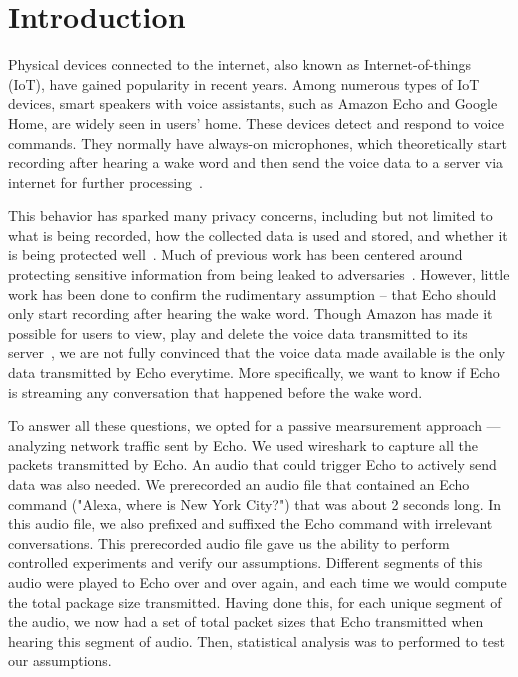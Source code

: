 \section{Introduction}
Physical devices connected to the internet, also known as Internet-of-things (IoT), have gained popularity in recent years. Among numerous types of IoT devices, smart speakers with voice assistants, such as Amazon Echo and Google Home, are widely seen in users' home. These devices detect and respond to voice commands. They normally have always-on microphones, which theoretically start recording after hearing a wake word and then send the voice data to a server via internet for further processing~\cite{AmazonEc68:online}.

This behavior has sparked many privacy concerns, including but not limited to what is being recorded, how the collected data is used and stored, and whether it is being protected well~\cite{lau2018alexa, fowler_2019, apthorpe2017smart, apthorpe2019keeping, apthorpe2017spying}. Much of previous work has been centered around protecting sensitive information from being leaked to adversaries~\cite{apthorpe2017smart, apthorpe2019keeping, apthorpe2017spying}. However, little work has been done to confirm the rudimentary assumption -- that Echo should only start recording after hearing the wake word. Though Amazon has made it possible for users to view, play and delete the voice data transmitted to its server~\cite{ford2019alexa}, we are not fully convinced that the voice data made available is the only data transmitted by Echo everytime. More specifically, we want to know if Echo is streaming any conversation that happened before the wake word.  

To answer all these questions, we opted for a passive mearsurement approach --- analyzing network traffic sent by Echo. We used wireshark to capture all the packets transmitted by Echo. An audio that could trigger Echo to actively send data was also needed. We prerecorded an audio file that contained an Echo command ("Alexa, where is New York City?") that was about 2 seconds long. In this audio file, we also prefixed and suffixed the Echo command with irrelevant conversations. This prerecorded audio file gave us the ability to perform controlled experiments and verify our assumptions. Different segments of this audio were played to Echo over and over again, and each time we would compute the total package size transmitted. Having done this, for each unique segment of the audio, we now had a set of total packet sizes that Echo transmitted when hearing this segment of audio. Then, statistical analysis was to performed to test our assumptions.

